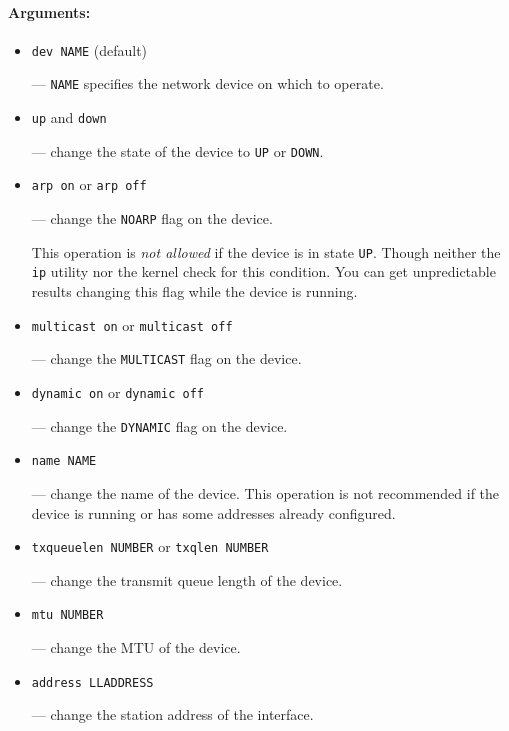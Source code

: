 \paragraph{Arguments:}

\begin{itemize}
\item \verb|dev NAME| (default)

--- \verb|NAME| specifies the network device on which to operate.

\item \verb|up| and \verb|down|

--- change the state of the device to \verb|UP| or \verb|DOWN|.

\item \verb|arp on| or \verb|arp off|

--- change the \verb|NOARP| flag on the device.

\begin{NB}
This operation is {\em not allowed\/} if the device is in state \verb|UP|.
Though neither the \verb|ip| utility nor the kernel check for this condition.
You can get unpredictable results changing this flag while the
device is running.
\end{NB}

\item \verb|multicast on| or \verb|multicast off|

--- change the \verb|MULTICAST| flag on the device.

\item \verb|dynamic on| or \verb|dynamic off|

--- change the \verb|DYNAMIC| flag on the device.

\item \verb|name NAME|

--- change the name of the device. This operation is not
recommended if the device is running or has some addresses
already configured.

\item \verb|txqueuelen NUMBER| or \verb|txqlen NUMBER|

--- change the transmit queue length of the device.

\item \verb|mtu NUMBER|

--- change the MTU of the device.

\item \verb|address LLADDRESS|

--- change the station address of the interface.


\end{itemize}
